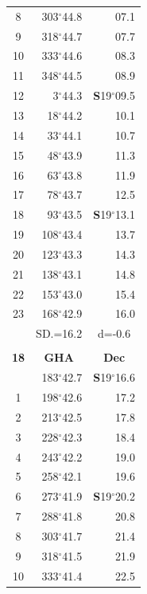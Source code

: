 \documentclass[10pt, a4paper]{report}
\begin{document}
\begin{scriptsize}
\begin{tabular*}{0.2\textwidth}[t]{@{\extracolsep{\fill}}|c|rr|}
8 & 303$^\circ$44.8 & 07.1\\
9 & 318$^\circ$44.7 & \raisebox{0.24ex}{\boldmath$\cdot$~\boldmath$\cdot$~~}07.7\\
10 & 333$^\circ$44.6 & 08.3\\
11 & 348$^\circ$44.5 & 08.9\\[2Pt]
12 & 3$^\circ$44.3 & \textbf{S}19$^\circ$09.5\\
13 & 18$^\circ$44.2 & 10.1\\
14 & 33$^\circ$44.1 & 10.7\\
15 & 48$^\circ$43.9 & \raisebox{0.24ex}{\boldmath$\cdot$~\boldmath$\cdot$~~}11.3\\
16 & 63$^\circ$43.8 & 11.9\\
17 & 78$^\circ$43.7 & 12.5\\[2Pt]
18 & 93$^\circ$43.5 & \textbf{S}19$^\circ$13.1\\
19 & 108$^\circ$43.4 & 13.7\\
20 & 123$^\circ$43.3 & 14.3\\
21 & 138$^\circ$43.1 & \raisebox{0.24ex}{\boldmath$\cdot$~\boldmath$\cdot$~~}14.8\\
22 & 153$^\circ$43.0 & 15.4\\
23 & 168$^\circ$42.9 & 16.0\\
\hline
\rule{0pt}{2.4ex} & \multicolumn{1}{c}{SD.=16.2} & \multicolumn{1}{c|}{d=-0.6}\\
\hline
\multicolumn{1}{c}{}\\[-0.5ex]\hline
\multicolumn{1}{|c|}{\rule{0pt}{2.6ex}\textbf{18}} & \multicolumn{1}{c}{\textbf{GHA}} & \multicolumn{1}{c|}{\textbf{Dec}}\\
\hline\rule{0pt}{2.6ex}\noindent
0 & 183$^\circ$42.7 & \textbf{S}19$^\circ$16.6\\
1 & 198$^\circ$42.6 & 17.2\\
2 & 213$^\circ$42.5 & 17.8\\
3 & 228$^\circ$42.3 & \raisebox{0.24ex}{\boldmath$\cdot$~\boldmath$\cdot$~~}18.4\\
4 & 243$^\circ$42.2 & 19.0\\
5 & 258$^\circ$42.1 & 19.6\\[2Pt]
6 & 273$^\circ$41.9 & \textbf{S}19$^\circ$20.2\\
7 & 288$^\circ$41.8 & 20.8\\
8 & 303$^\circ$41.7 & 21.4\\
9 & 318$^\circ$41.5 & \raisebox{0.24ex}{\boldmath$\cdot$~\boldmath$\cdot$~~}21.9\\
10 & 333$^\circ$41.4 & 22.5\\

\end{tabular*}
\end{scriptsize}
\end{document}
